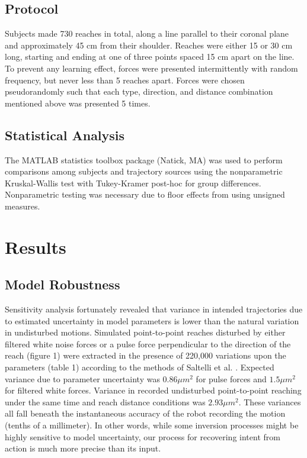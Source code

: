 \documentclass[10pt]{article}
\begin{document}
\subsection*{Protocol}
Subjects made 730 reaches in total, along a line parallel to their coronal plane and approximately 45 cm from their shoulder. Reaches were either 15 or 30 cm long, starting and ending at one of three points spaced 15 cm apart on the line. To prevent any learning effect, forces were presented intermittently with random frequency, but never less than 5 reaches apart. Forces were chosen pseudorandomly such that each type, direction, and distance combination mentioned above was presented 5 times.  

\subsection*{Statistical Analysis}
The MATLAB statistics toolbox package (Natick, MA) was used to perform comparisons among subjects and trajectory sources using the nonparametric Kruskal-Wallis test with Tukey-Kramer post-hoc for group differences. Nonparametric testing was necessary due to floor effects from using unsigned measures.


\section*{Results}

\subsection*{Model Robustness}
Sensitivity analysis fortunately revealed that variance in intended trajectories due to estimated uncertainty in model parameters is lower than the natural variation in undisturbed motions.  Simulated point-to-point reaches disturbed by either filtered white noise forces or a pulse force perpendicular to the direction of the reach (figure 1) were extracted in the presence of 220,000 variations upon the parameters (table 1) according to the methods of Saltelli et al. \cite{saltelli2010variance}. Expected variance due to parameter uncertainty was $0.86  \mu m^2$ for pulse forces and $1.5 \mu m^2$ for filtered white forces. Variance in recorded undisturbed point-to-point reaching under the same time and reach distance conditions was $2.93 \mu m^2$. These variances all fall beneath the instantaneous accuracy of the robot recording the motion (tenths of a millimeter). In other words, while some inversion processes might be highly sensitive to model uncertainty, our process for recovering intent from action is much more precise than its input.
\end{document}
